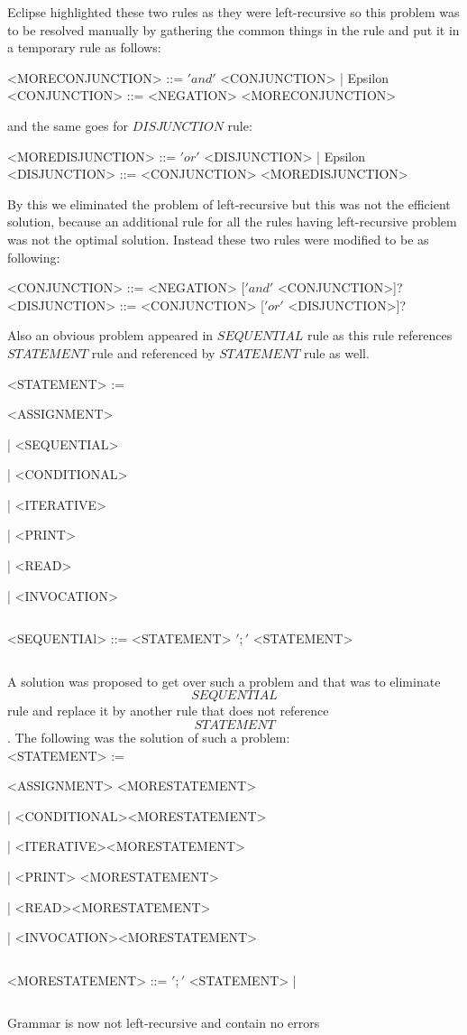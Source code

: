 \documentclass[a4paper]{article}
\begin{document}
 $$ $$
 $$ $$
 
 Eclipse highlighted these two rules as they were left-recursive so this problem was to be resolved manually by gathering the common things in the rule and put it in a temporary rule as follows:
 
 $$ $$
 <MORECONJUNCTION> ::= $'and'$ <CONJUNCTION> | Epsilon
  $$ $$
  <CONJUNCTION> ::= <NEGATION> <MORECONJUNCTION>
 $$ $$
 
 and the same goes for $DISJUNCTION$ rule:
 
 $$  $$
 <MOREDISJUNCTION> ::= $'or'$ <DISJUNCTION> | Epsilon
 $$ $$
 <DISJUNCTION> ::= <CONJUNCTION> <MOREDISJUNCTION>
 $$ $$
 
 By this we eliminated the problem of left-recursive but this was not the efficient solution, because an additional rule for all the rules having left-recursive problem was not the optimal solution. Instead these two rules were modified to be as following:
 
   $$ $$
  <CONJUNCTION> ::= <NEGATION> [$'and'$ <CONJUNCTION>]? 
 $$ $$
  <DISJUNCTION> ::= <CONJUNCTION> [$'or'$ <DISJUNCTION>]?
 $$ $$
 
 \newpage
 
 Also an obvious problem appeared in $SEQUENTIAL$ rule as this rule references $STATEMENT$ rule and referenced by $STATEMENT$ rule as well.
 
 $$ $$
<STATEMENT> := \centerline{  <ASSIGNMENT>} \newline \centerline {| <SEQUENTIAL>} \newline \centerline{ |  <CONDITIONAL> } \newline \centerline{ |  <ITERATIVE>} \newline \centerline{  | <PRINT> } \newline \centerline { | <READ>} \newline \centerline {| <INVOCATION>}



$$ $$

<SEQUENTIAl> ::= <STATEMENT> $';'$ <STATEMENT>

$$ $$

A solution was proposed to get over such a problem and that was to eliminate $$SEQUENTIAL$$ rule and replace it by another rule that does not reference $$STATEMENT$$. The following was the solution of such a problem:
 $$ $$
<STATEMENT> := \centerline{  <ASSIGNMENT> <MORESTATEMENT>}  \newline \centerline{ |  <CONDITIONAL><MORESTATEMENT> } \newline \centerline{ |  <ITERATIVE><MORESTATEMENT>} \newline \centerline{  | <PRINT> <MORESTATEMENT> } \newline \centerline { | <READ><MORESTATEMENT>} \newline \centerline {| <INVOCATION><MORESTATEMENT>}



$$ $$

<MORESTATEMENT> ::=  $';'$ <STATEMENT> |

$$ $$

Grammar is now not left-recursive and contain no errors
\end{document}
